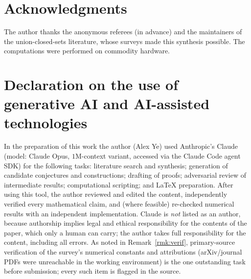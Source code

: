 \documentclass[11pt]{amsart}
\theoremstyle{definition}
\theoremstyle{remark}
\begin{document}
\section*{Acknowledgments}
The author thanks the anonymous referees (in advance) and the maintainers of the
union-closed-sets literature, whose surveys made this synthesis possible. The
computations were performed on commodity hardware.

\section*{Declaration on the use of generative AI and AI-assisted technologies}
In the preparation of this work the author (Alex Ye) used Anthropic's Claude
(model: Claude Opus, $1$M-context variant, accessed via the Claude Code agent SDK)
for the following tasks: literature search and synthesis; generation of candidate
conjectures and constructions; drafting of proofs; adversarial review of
intermediate results; computational scripting; and \LaTeX{} preparation. After
using this tool, the author reviewed and edited the content, independently
verified every mathematical claim, and (where feasible) re-checked numerical
results with an independent implementation. Claude is \emph{not} listed as an
author, because authorship implies legal and ethical responsibility for the
contents of the paper, which only a human can carry; the author takes full
responsibility for the content, including all errors. As noted in
Remark~\ref{rmk:verif}, primary-source verification of the survey's numerical
constants and attributions (arXiv/journal PDFs were unreachable in the working
environment) is the one outstanding task before submission; every such item is
flagged in the source.



\end{document}
